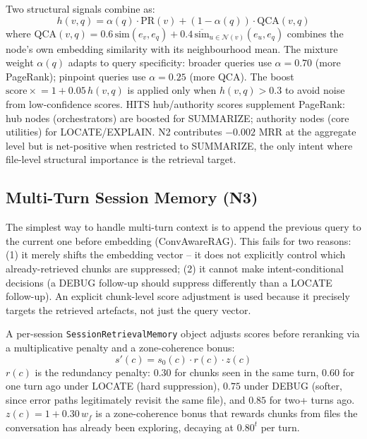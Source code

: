 \documentclass[conference]{IEEEtran}
\begin{document}
Two structural signals combine as:
\begin{equation}
h(v,q) = \alpha(q)\cdot\text{PR}(v) + (1{-}\alpha(q))\cdot\text{QCA}(v,q)
\end{equation}
where $\text{QCA}(v,q) = 0.6\,\text{sim}(e_v, e_q) + 0.4\,\overline{\text{sim}}_{u\in\mathcal{N}(v)}(e_u, e_q)$
combines the node's own embedding similarity with its neighbourhood mean.
The mixture weight $\alpha(q)$ adapts to query specificity: broader queries
use $\alpha{=}0.70$ (more PageRank); pinpoint queries use $\alpha{=}0.25$
(more QCA). The boost $\text{score}\mathrel{\times}=1+0.05\,h(v,q)$ is
applied only when $h(v,q) > 0.3$ to avoid noise from low-confidence scores.
HITS hub/authority scores supplement PageRank: hub nodes (orchestrators)
are boosted for SUMMARIZE; authority nodes (core utilities) for LOCATE/EXPLAIN.
N2 contributes $-0.002$ MRR at the aggregate level but is net-positive when
restricted to SUMMARIZE, the only intent where file-level structural importance
is the retrieval target.

\subsection{Multi-Turn Session Memory (N3)}

The simplest way to handle multi-turn context is to
append the previous query to the current one before embedding (ConvAwareRAG).
This fails for two reasons: (1) it merely shifts the embedding vector --
it does not explicitly control which already-retrieved chunks are suppressed;
(2) it cannot make intent-conditional decisions (a DEBUG follow-up should
suppress differently than a LOCATE follow-up). An explicit
chunk-level score adjustment is used because it precisely targets the retrieved
artefacts, not just the query vector.

A per-session \texttt{SessionRetrievalMemory} object adjusts scores before
reranking via a multiplicative penalty and a zone-coherence bonus:
\begin{equation}
s'(c) = s_0(c)\cdot r(c)\cdot z(c)
\end{equation}
$r(c)$ is the redundancy penalty: $0.30$ for chunks seen in the same turn,
$0.60$ for one turn ago under LOCATE (hard suppression), $0.75$ under DEBUG
(softer, since error paths legitimately revisit the same file), and $0.85$
for two+ turns ago. $z(c) = 1 + 0.30\,w_f$ is a zone-coherence bonus that
rewards chunks from files the conversation has already been exploring,
decaying at $0.80^t$ per turn.
\end{document}
